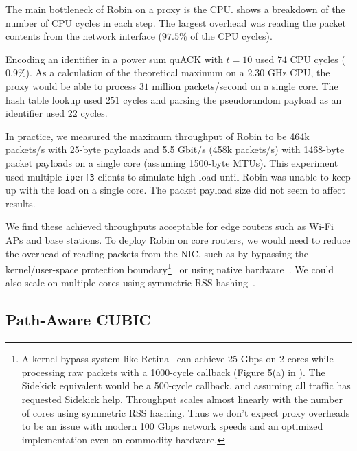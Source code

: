 

The main bottleneck of Robin on a proxy is the CPU\@.
 shows a breakdown of the number of CPU cycles in each
step. The largest overhead was reading the packet contents from the network
interface ($97.5\%$ of the CPU cycles).

Encoding an identifier in a power sum quACK with $t=10$ used $74$ CPU
cycles ($0.9\%$). As a calculation of the theoretical maximum on a 2.30 GHz
CPU, the proxy would be able to process $31$ million packets/second on a single
core. The hash table lookup used $251$ cycles and parsing the pseudorandom
payload as an identifier used $22$ cycles.

In practice, we measured the maximum throughput of Robin to
be 464k packets/s with 25-byte payloads and 5.5 Gbit/s (458k packets/s) with
1468-byte packet payloads on a single core (assuming 1500-byte MTUs).
This experiment used multiple \texttt{iperf3} clients to simulate high
load until Robin was unable to keep up with the load on a single core.
The packet payload size did not seem to affect results.

We find these achieved throughputs acceptable for edge routers such as Wi-Fi
APs and base stations.
To deploy Robin on core routers, we would need to reduce the overhead of reading
packets from the NIC, such as by bypassing the kernel/user-space
protection boundary\footnote{
A kernel-bypass system like Retina~\cite{wan2022retina} can achieve
25 Gbps on 2 cores while processing raw packets with a 1000-cycle callback
(Figure 5(a) in \cite{wan2022retina}). The Sidekick equivalent would be a 500-cycle
callback, and assuming all traffic has requested Sidekick help. Throughput scales
almost linearly with the number of cores using symmetric RSS hashing.
Thus we don't expect proxy overheads to be an issue with modern 100 Gbps network
speeds and an optimized implementation even on commodity hardware.
}~\cite{dpdk,mccanne1993bsd,wan2022retina}
or using native hardware~\cite{bosshart2014p4}.
We could also scale on multiple cores using symmetric RSS hashing~\cite{woo2012scalable}.

\subsection{Path-Aware CUBIC}
\label{sec:sidekick:evaluation:pacubic}



